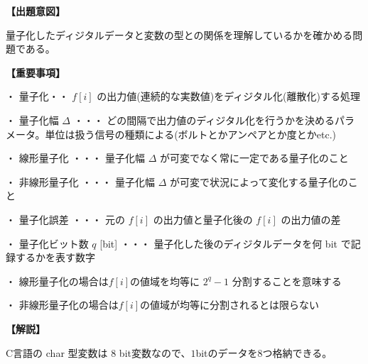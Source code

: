 \noindent \textbf{【出題意図】}

\noindent 量子化したディジタルデータと変数の型との関係を理解しているかを確かめる問題である。

\vspace{1em}
\noindent \textbf{【重要事項】}

\medskip
\noindent ・ 量子化・・ $f[i]$ の出力値(連続的な実数値)をディジタル化(離散化)する処理

\medskip
\noindent ・ 量子化幅 $\Delta$ ・・・ どの間隔で出力値のディジタル化を行うかを決めるパラメータ。単位は扱う信号の種類による(ボルトとかアンペアとか度とかetc.)

\medskip
\noindent ・ 線形量子化 ・・・ 量子化幅  $\Delta$ が可変でなく常に一定である量子化のこと

\medskip
\noindent ・ 非線形量子化 ・・・ 量子化幅  $\Delta$ が可変で状況によって変化する量子化のこと

\medskip
\noindent ・ 量子化誤差 ・・・ 元の $f[i]$ の出力値と量子化後の $f[i]$ の出力値の差

\medskip
\noindent ・ 量子化ビット数 $q$ [bit] ・・・ 量子化した後のディジタルデータを何 bit で記録するかを表す数字

\medskip
\noindent ・ 線形量子化の場合は$f[i]$の値域を均等に $2^q-1$ 分割することを意味する

\medskip
\noindent ・ 非線形量子化の場合は$f[i]$の値域が均等に分割されるとは限らない

\vspace{1em}
\noindent \textbf{【解説】}

\noindent C言語の char 型変数は $8$ bit変数なので、$1$bitのデータを$8$つ格納できる。


